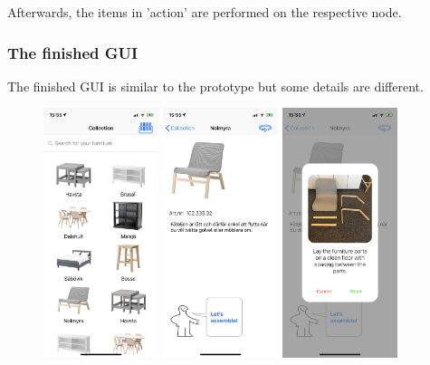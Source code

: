 Afterwards, the items in 'action' are performed on the respective node.

\subsubsection{The finished GUI}
The finished GUI is similar to the prototype but some details are different.

\begin{figure}[!hbtp]
\begin{center}
\includegraphics[width = 0.3\textwidth]{./Images/Application1}
\includegraphics[width = 0.3\textwidth]{./Images/Application2}
\includegraphics[width = 0.3\textwidth]{./Images/Application3}

\end{center}
\end{figure}
